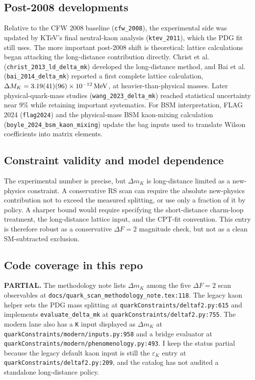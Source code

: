 \subsection*{Post-2008 developments}
Relative to the CFW 2008 baseline (\texttt{cfw\_2008}), the experimental
side was updated by KTeV's final neutral-kaon analysis
(\texttt{ktev\_2011}), which the PDG fit still uses.  The more important
post-2008 shift is theoretical: lattice calculations began attacking the
long-distance contribution directly.  Christ et al.
(\texttt{christ\_2013\_ld\_delta\_mk}) developed the long-distance method,
and Bai et al. (\texttt{bai\_2014\_delta\_mk}) reported a first complete
lattice calculation,
\(\Delta M_K=3.19(41)(96)\times10^{-12}\,{\rm MeV}\), at
heavier-than-physical masses.  Later physical-quark-mass studies
(\texttt{wang\_2023\_delta\_mk}) reached statistical uncertainty near
\(9\%\) while retaining important systematics.  For BSM interpretation, FLAG
2024 (\texttt{flag2024}) and the physical-mass BSM kaon-mixing calculation
(\texttt{boyle\_2024\_bsm\_kaon\_mixing}) update the bag inputs used to
translate Wilson coefficients into matrix elements.

\subsection*{Constraint validity and model dependence}
The experimental number is precise, but \(\Delta m_K\) is long-distance
limited as a new-physics constraint.  A conservative RS scan can require the
absolute new-physics contribution not to exceed the measured splitting, or use
only a fraction of it by policy.  A sharper bound would require specifying the
short-distance charm-loop treatment, the long-distance lattice input, and the
CPT-fit convention.  This entry is therefore robust as a conservative
\(\Delta F=2\) magnitude check, but not as a clean SM-subtracted exclusion.

\subsection*{Code coverage in this repo}
\textbf{PARTIAL.}  The methodology note lists \(\Delta m_K\) among the five
\(\Delta F=2\) scan observables at
\texttt{docs/quark\_scan\_methodology\_note.tex:118}.  The legacy kaon helper
sets the PDG mass splitting at \texttt{quarkConstraints/deltaf2.py:615} and
implements \texttt{evaluate\_delta\_mk} at
\texttt{quarkConstraints/deltaf2.py:755}.  The modern lane also has a
\texttt{K} input displayed as \(\Delta m_K\) at
\texttt{quarkConstraints/modern/inputs.py:958} and a bridge evaluator at
\texttt{quarkConstraints/modern/phenomenology.py:493}.  I keep the status
partial because the legacy default kaon input is still the \(\varepsilon_K\)
entry at \texttt{quarkConstraints/deltaf2.py:209}, and the catalog has not
audited a standalone long-distance policy.

